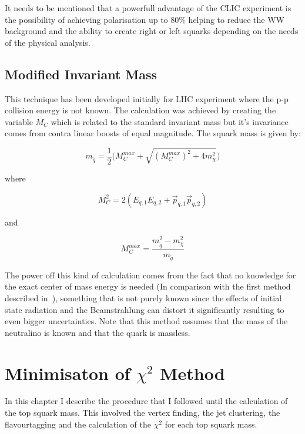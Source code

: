 \documentclass[12pt,a4paper]{report}
\begin{document}
It needs to be mentioned that a powerfull advantage of the CLIC experiment is the possibility of achieving 
polarisation up to 80$\%$ helping to reduce the WW background and the ability to create right or left squarks
depending on the needs of the physical analysis.

\subsection{Modified Invariant Mass}

This technique has been developed initially for LHC experiment where the p-p collision energy is not known.
The calculation was achieved by creating the variable $M_{C}$ which is related to the standard 
invariant mass but it's invariance comes from contra linear boosts of equal magnitude. The squark mass is given
by:

\begin{equation}
 m_{\tilde{q}}=\frac{1}{2} \big(M_{C}^{max} + \sqrt{(M_{C}^{max})^{2} + 4m_{\chi}^{2}} \big)
\end{equation}

where 

\begin{equation}
 M_{C}^{2}=2(E_{q,1}E_{q,2}+\vec{p}_{q,1}\vec{p}_{q,2})
\end{equation}

and

\begin{equation}
 M_{C}^{max}=\frac{m^{2}_{\tilde{q}}-m^{2}_{\chi}}{m_{\tilde{q}}}
\end{equation}

The power off this kind of calculation comes from the fact that no knowledge for the exact center of mass 
energy is needed (In comparison with the first method described in~\cite{simon2010techniques}), something that is not purely known since the effects of initial state radiation and
the Beamstrahlung can distort it significantly resulting to even bigger uncertainties. Note that this method 
assumes that the mass of the neutralino is known and that the quark is massless. 

\section{Minimisaton of $\chi^{2}$ Method}

In this chapter I describe the procedure that I followed until the calculation of the top squark mass. 
This involved the vertex finding, the jet clustering, the flavourtagging and the calculation of the $\chi^{2}$
for each top squark mass.
\end{document}
